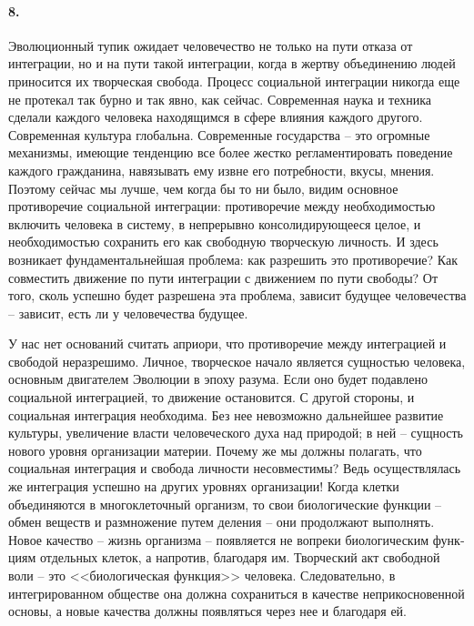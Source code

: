 \documentclass{book}
\begin{document}
\paragraph{8.} Эволюционный тупик ожидает человечество не только на пути отказа от интеграции, но и на пути такой интеграции, когда в жертву объединению людей приносится их творческая свобода. Процесс социальной интеграции никогда еще не протекал так бурно и так явно, как сейчас. Современная наука и техника сделали каждого человека находящимся в сфере влияния каждого другого. Современная культура глобальна. Современные государства -- это огромные механизмы, имеющие тенденцию все более жестко регламентировать поведение каждого гражданина, навязывать ему извне его потребности, вкусы, мнения. Поэтому сейчас мы лучше, чем когда бы то ни было, видим основное противоречие социальной интеграции: противоречие между необходимостью включить человека в систему, в непрерывно консолидирующееся целое, и необходимостью сохранить его как свободную творческую личность. И здесь возникает фундаментальнейшая проблема: как разрешить это противоречие? Как совместить движение по пути интеграции с движением по пути свободы? От того,
 сколь успешно будет разрешена эта проблема, зависит будущее человечества -- зависит, есть ли у человечества будущее.

У нас нет оснований считать априори, что противоречие между интеграцией и свободой неразрешимо. Личное, творческое начало является сущностью человека, основным двигателем Эволюции в эпоху разума. Если оно будет подавлено социальной интеграцией, то движение остановится. С другой стороны, и социальная интеграция необходима. Без нее невозможно дальнейшее развитие культуры, увеличение власти человеческого духа над природой; в ней -- сущность нового уровня организации материи. Почему же мы должны полагать, что социальная интеграция и свобода личности несовместимы? Ведь осуществлялась же интеграция успешно на других уровнях организации! Когда клетки объединяются в многоклеточный организм, то свои биологические функции -- обмен веществ и размножение путем деления -- они продолжают выполнять. Новое качество -- жизнь организма -- появляется не вопреки биологическим функ­циям отдельных клеток, а напротив, благодаря им. Творческий акт свободной воли -- это <<биологическая функция>> человека. Следовательно, в 
интегрированном обществе она должна сохраниться в качестве неприкосновенной основы, а новые ка­чества должны появляться через нее и благодаря ей.
\end{document}
